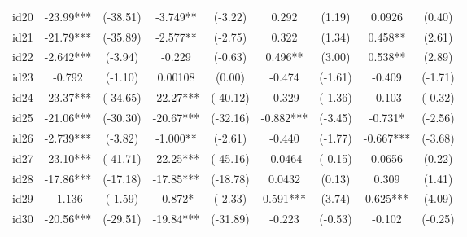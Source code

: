 \documentclass[entropy,article,submit,moreauthors,LaTeX and dvi2pdf]{Definitions/mdpi}
\begin{document}
\begin{center}
\begin{longtable}{ccccccccc}
id20                                          & -23.99***     & (-38.51)      & -3.749**        & (-3.22)          & 0.292             & (1.19)            & 0.0926            & (0.40)            \\
id21                                          & -21.79***     & (-35.89)      & -2.577**        & (-2.75)          & 0.322             & (1.34)            & 0.458**           & (2.61)            \\
id22                                          & -2.642***     & (-3.94)       & -0.229          & (-0.63)          & 0.496**           & (3.00)            & 0.538**           & (2.89)            \\
id23                                          & -0.792        & (-1.10)       & 0.00108         & (0.00)           & -0.474            & (-1.61)           & -0.409            & (-1.71)           \\
id24                                          & -23.37***     & (-34.65)      & -22.27***       & (-40.12)         & -0.329            & (-1.36)           & -0.103            & (-0.32)           \\
id25                                          & -21.06***     & (-30.30)      & -20.67***       & (-32.16)         & -0.882***         & (-3.45)           & -0.731*           & (-2.56)           \\
id26                                          & -2.739***     & (-3.82)       & -1.000**        & (-2.61)          & -0.440            & (-1.77)           & -0.667***         & (-3.68)           \\
id27                                          & -23.10***     & (-41.71)      & -22.25***       & (-45.16)         & -0.0464           & (-0.15)           & 0.0656            & (0.22)            \\
id28                                          & -17.86***     & (-17.18)      & -17.85***       & (-18.78)         & 0.0432            & (0.13)            & 0.309             & (1.41)            \\
id29                                          & -1.136        & (-1.59)       & -0.872*         & (-2.33)          & 0.591***          & (3.74)            & 0.625***          & (4.09)            \\
id30                                          & -20.56***     & (-29.51)      & -19.84***       & (-31.89)         & -0.223            & (-0.53)           & -0.102            & (-0.25)           \\

\end{longtable}
\end{center}
\end{document}

